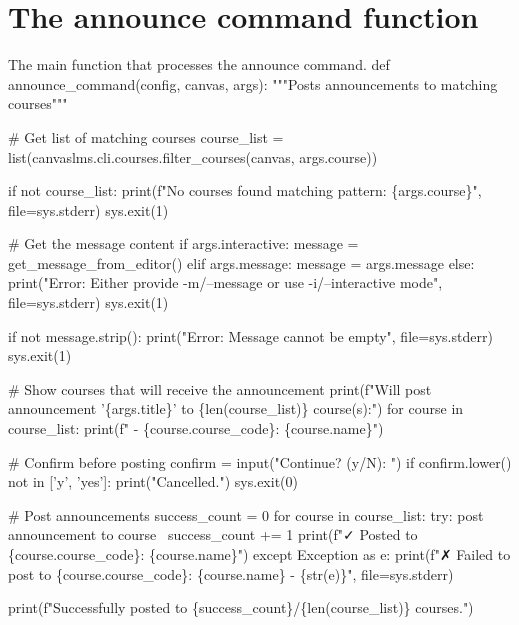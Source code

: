 \section{The announce command function}

The main function that processes the announce command.
\nwenddocs{}\endmoddef\nwstartdeflinemarkup{}\nwenddeflinemarkup
def announce_command(config, canvas, args):
  """Posts announcements to matching courses"""
  
  # Get list of matching courses
  course_list = list(canvaslms.cli.courses.filter_courses(canvas, args.course))
  
  if not course_list:
    print(f"No courses found matching pattern: \{args.course\}", file=sys.stderr)
    sys.exit(1)
  
  # Get the message content
  if args.interactive:
    message = get_message_from_editor()
  elif args.message:
    message = args.message
  else:
    print("Error: Either provide -m/--message or use -i/--interactive mode", file=sys.stderr)
    sys.exit(1)
  
  if not message.strip():
    print("Error: Message cannot be empty", file=sys.stderr)
    sys.exit(1)
  
  # Show courses that will receive the announcement
  print(f"Will post announcement '\{args.title\}' to \{len(course_list)\} course(s):")
  for course in course_list:
    print(f"  - \{course.course_code\}: \{course.name\}")
  
  # Confirm before posting
  confirm = input("Continue? (y/N): ")
  if confirm.lower() not in ['y', 'yes']:
    print("Cancelled.")
    sys.exit(0)
  
  # Post announcements
  success_count = 0
  for course in course_list:
    try:
      \LA{}post announcement to course~{\nwtagstyle{}}\RA{}
      success_count += 1
      print(f"✓ Posted to \{course.course_code\}: \{course.name\}")
    except Exception as e:
      print(f"✗ Failed to post to \{course.course_code\}: \{course.name\} - \{str(e)\}", file=sys.stderr)
  
  print(f"Successfully posted to \{success_count\}/\{len(course_list)\} courses.")
\nwendcode{}\nwdocspar


